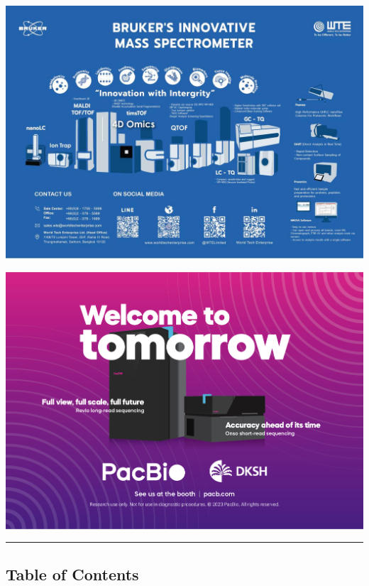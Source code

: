 \documentclass[
]{article}
\begin{document}
\href{https://worldtechenterprise.com}{\includegraphics{./Page/elements/img/Exhibitors/WTE.jpeg}}

\href{https://www.dksh.com/th-en/home}{\includegraphics{./Page/elements/img/Exhibitors/DKSH.png}}

\begin{center}\rule{0.5\linewidth}{0.5pt}\end{center}

\hypertarget{table-of-contents}{%
\subsection{Table of Contents}\label{table-of-contents}}
\end{document}
